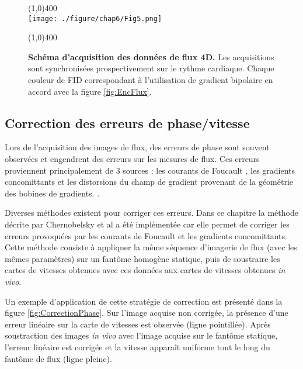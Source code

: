 \begin{figure}[H]
\centering
\line(1,0){400} \\
\texttt{[image: ./figure/chap6/Fig5.png]}
\caption[Schéma acquisition des données de flux 4D.]{\label{fig:SchemaAcqFlux} \textbf{Schéma d'acquisition des données de flux 4D.} Les acquisitions sont synchronisées prospectivement sur le rythme cardiaque. Chaque couleur de FID correspondant à l'utilisation de gradient bipolaire en accord avec la figure \ref{fig:EncFlux}.}
\line(1,0){400} \\ 
\end{figure}

\subsection{Correction des erreurs de phase/vitesse}

Lors de l'acquisition des images de flux, des erreurs de phase sont souvent observées et engendrent des erreurs sur les mesures de flux. Ces erreurs proviennent principalement de 3 sources : les courants de Foucault \cite{Walker:1993aa}, les gradients concomittants \cite{Bernstein:1998aa} et les distorsions du champ de gradient provenant de la géométrie des bobines de gradients. \cite{Markl:2003aa}. 

Diverses méthodes existent pour corriger ces erreurs. Dans ce chapitre la méthode décrite par Chernobelsky et al \cite{Chernobelsky:2007aa} a été implémentée car elle permet de corriger les erreurs provoquées par les courants de Foucault et les gradients concomittants. Cette méthode consiste à appliquer la même séquence d'imagerie de flux (avec les mêmes paramètres) sur un fantôme homogène statique, puis de soustraire les cartes de vitesses obtenues avec ces données aux cartes de vitesses obtenues \textit{in vivo}. 

Un exemple d'application de cette stratégie de correction est présenté dans la figure \ref{fig:CorrectionPhase}. Sur l'image acquise non corrigée, la présence d'une erreur linéaire sur la carte de vitesses est observée (ligne pointillée). Après soustraction des images \textit{in vivo} avec l'image acquise sur le fantôme statique, l'erreur linéaire est corrigée et la vitesse apparaît uniforme tout le long du fantôme de flux (ligne pleine).


